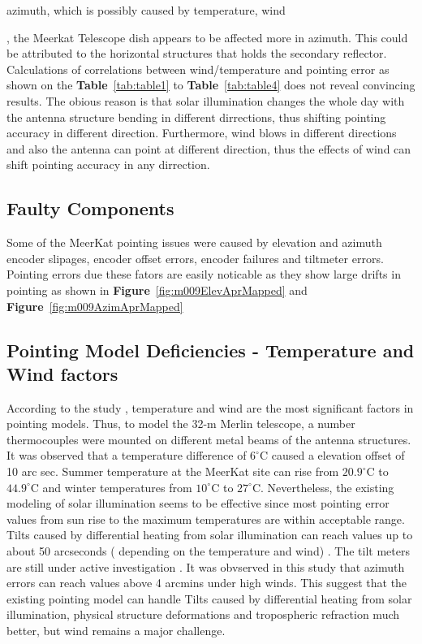 \documentclass{article}
\begin{document}
azimuth, which is possibly caused by temperature, wind {\cite{kong}, the Meerkat Telescope dish appears to be affected more in azimuth.   This could be attributed to the horizontal structures that holds the secondary reflector.  \\

Calculations of correlations between wind/temperature and pointing error as shown on the \textbf{Table}~\ref{tab:table1} to \textbf{Table}~\ref{tab:table4} does not reveal convincing results.   The obious  reason is that solar illumination changes the whole day with the antenna structure bending in different dirrections, thus shifting pointing accuracy in different direction.  Furthermore, wind blows in different directions and also the antenna can point at different direction, thus the effects of wind can shift pointing accuracy in any dirrection.  


\subsection{Faulty Components}
Some of the MeerKat pointing issues were  caused by elevation and azimuth encoder slipages, encoder offset errors, encoder failures and tiltmeter errors.  Pointing errors due these fators are easily noticable as they show large drifts in pointing as shown in \textbf{Figure}~\ref{fig:m009ElevAprMapped} and \textbf{Figure}~\ref{fig:m009AzimAprMapped} 

\subsection{Pointing Model Deficiencies - Temperature and Wind factors}

According to the study \cite{Bayley}, temperature and wind are the most significant factors in pointing models.  Thus, to model the 32-m Merlin telescope, a number thermocouples were mounted on different metal beams of the antenna structures.  It was observed that a temperature difference of $6^\circ$C  caused a elevation offset of 10 arc sec.  Summer temperature at the MeerKat site can rise from $20.9^\circ$C to $44.9^\circ$C and winter temperatures from $10^\circ$C to $27^\circ$C. Nevertheless, the existing modeling of solar illumination seems to be effective since most pointing error values from sun rise to the maximum temperatures are within acceptable range.\\



Tilts caused by differential heating from solar illumination can reach values up to about 50 arcseconds ( depending on the temperature and wind) \cite{Tony}.  The tilt meters are still under active investigation  \cite{SE}.  It was obvserved in this study that azimuth errors can reach values above 4 arcmins under high winds.  This suggest that the existing pointing model can handle Tilts caused by differential heating from solar illumination, physical structure deformations and tropospheric refraction much better, but wind remains a major challenge. 



}
\end{document}
